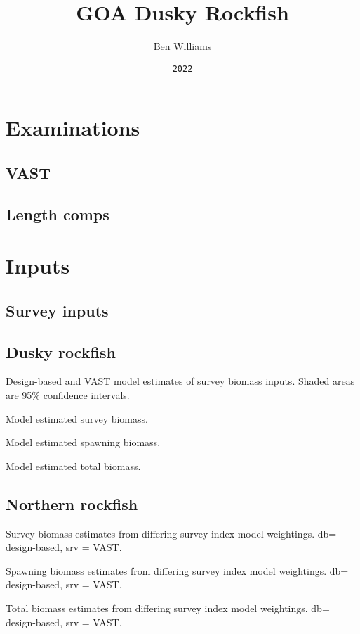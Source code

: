 \documentclass[
]{book}
\title{GOA Dusky Rockfish}
\author{Ben Williams}
\date{\texttt{2022}}
\begin{document}
\maketitle

{
\setcounter{tocdepth}{1}
\tableofcontents
}
\hypertarget{examinations}{%
\chapter{Examinations}\label{examinations}}

\hypertarget{vast}{%
\section{VAST}\label{vast}}

\hypertarget{length-comps}{%
\section{Length comps}\label{length-comps}}

\hypertarget{inputs}{%
\chapter{Inputs}\label{inputs}}

\hypertarget{survey-inputs}{%
\section{Survey inputs}\label{survey-inputs}}

\hypertarget{dusky-rockfish}{%
\section{Dusky rockfish}\label{dusky-rockfish}}

\label{fig:unnamed-chunk-3}Design-based and VAST model estimates of survey biomass inputs. Shaded areas are 95\% confidence intervals.

\label{fig:unnamed-chunk-4}Model estimated survey biomass.

\label{fig:unnamed-chunk-5}Model estimated spawning biomass.

\label{fig:unnamed-chunk-6}Model estimated total biomass.

\hypertarget{northern-rockfish}{%
\section{Northern rockfish}\label{northern-rockfish}}

\label{fig:unnamed-chunk-7}Survey biomass estimates from differing survey index model weightings. db= design-based, srv = VAST.

\label{fig:unnamed-chunk-8}Spawning biomass estimates from differing survey index model weightings. db= design-based, srv = VAST.

\label{fig:unnamed-chunk-9}Total biomass estimates from differing survey index model weightings. db= design-based, srv = VAST.

  
\end{document}
